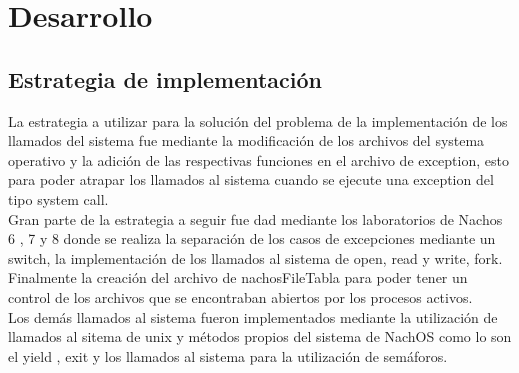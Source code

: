 \section[Desarrollo]{Desarrollo}
  \subsection{Estrategia de implementación}   
    La estrategia a utilizar para la solución del problema de la implementación de los llamados del sistema fue mediante la modificación de los archivos del systema operativo y la adición de las respectivas funciones en el archivo de exception, esto para poder atrapar los llamados al sistema cuando se ejecute una exception del tipo system call. \\
    Gran parte de la estrategia a seguir fue dad mediante los laboratorios de Nachos 6 , 7 y 8 donde se realiza la separación de los casos de excepciones mediante un switch, la implementación de los llamados al sistema de open, read y write, fork. \\
    Finalmente la creación del archivo de nachosFileTabla para poder tener un control de los archivos que se encontraban abiertos por los procesos activos. \\
    Los demás llamados al sistema fueron implementados mediante la utilización de llamados al sitema de unix y métodos propios del sistema de NachOS como lo son el yield , exit y los llamados al sistema para la utilización de semáforos.
    
